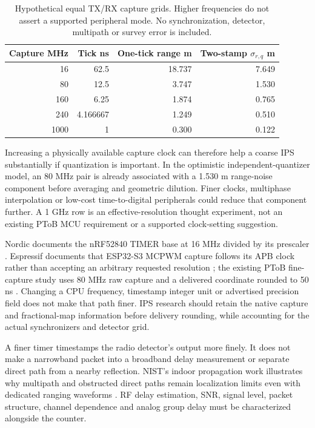 \documentclass[11pt,letterpaper]{article}
\begin{document}
\begin{table}[ht]\centering\small
\caption{Hypothetical equal TX/RX capture grids. Higher frequencies do not assert a supported peripheral mode. No synchronization, detector, multipath or survey error is included.}\label{tab:timer}
\begin{tabular}{@{}rrrr@{}}\toprule
Capture MHz & Tick ns & One-tick range m & Two-stamp $\sigma_{r,q}$ m\\\midrule
16&62.5&18.737&7.649\\
80&12.5&3.747&1.530\\
160&6.25&1.874&0.765\\
240&4.166667&1.249&0.510\\
1000&1&0.300&0.122\\\bottomrule\end{tabular}
\end{table}

Increasing a physically available capture clock can therefore help a coarse IPS substantially if quantization is important. In the optimistic independent-quantizer model, an 80 MHz pair is already associated with a 1.530 m range-noise component before averaging and geometric dilution. Finer clocks, multiphase interpolation or low-cost time-to-digital peripherals could reduce that component further. A 1 GHz row is an effective-resolution thought experiment, not an existing PToB MCU requirement or a supported clock-setting suggestion.

Nordic documents the nRF52840 TIMER base at 16 MHz divided by its prescaler \cite{nordic}. Espressif documents that ESP32-S3 MCPWM capture follows its APB clock rather than accepting an arbitrary requested resolution \cite{espressif}; the existing PToB fine-capture study uses 80 MHz raw capture and a delivered coordinate rounded to 50 ns \cite{fine}. Changing a CPU frequency, timestamp integer unit or advertised precision field does not make that path finer. IPS research should retain the native capture and fractional-map information before delivery rounding, while accounting for the actual synchronizers and detector grid.

A finer timer timestamps the radio detector's output more finely. It does not make a narrowband packet into a broadband delay measurement or separate direct path from a nearby reflection. NIST's indoor propagation work illustrates why multipath and obstructed direct paths remain localization limits even with dedicated ranging waveforms \cite{nistindoor}. RF delay estimation, SNR, signal level, packet structure, channel dependence and analog group delay must be characterized alongside the counter.
\end{document}
